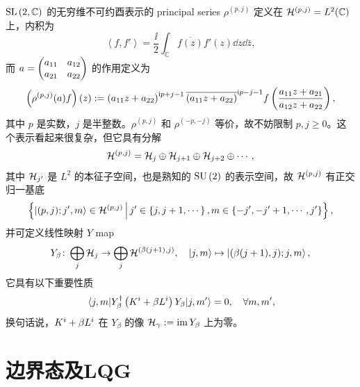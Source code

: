 			$\mathrm{SL}\left( 2,\mathbb{C} \right)$ 的无穷维不可约酉表示的 principal series $\rho^{(p,j)}$ 定义在 $\mathcal{H}^{(p,j)} = L^2(\mathbb{C})$ 上，内积为
			\begin{equation}
				\left\langle f, f' \right\rangle = \frac{\ii}{2} \int_{\mathbb{C}} \overline{f(z)} f'(z) \dd{z} \dd{\bar{z}},
			\end{equation}
			而 $a = \mqty(a_{11} & a_{12} \\ a_{21} & a_{22})$ 的作用定义为
			\begin{equation}
				\left( \rho^{(p,j)}(a) f \right)(z) := \left( a_{11} z + a_{22} \right)^{\mathrm{i} p+j-1} \overline{\left( a_{11} z + a_{22} \right)}^{\mathrm{i} p-j-1} f\left( \frac{a_{11}z+a_{21}}{a_{12}z +a_{22}} \right),
			\end{equation}
			其中 $p$ 是实数，$j$ 是半整数。$\rho^{(p,j)}$ 和 $\rho^{(-p,-j)}$ 等价，故不妨限制 $p,j \geqslant 0$。这个表示看起来很复杂，但它具有分解
			\begin{equation}
				\mathcal{H}^{(p,j)} = \mathcal{H}_j \oplus \mathcal{H}_{j+1} \oplus \mathcal{H}_{j+2} \oplus \cdots,
			\end{equation}
			其中 $\mathcal{H}_{j'}$ 是 $L^2$ 的本征子空间，也是熟知的 $\mathrm{SU}\left(2\right)$ 的表示空间，故 $\mathcal{H}^{(p,j)}$ 有正交归一基底
			\begin{equation}
				\left\{ \ket{(p,j);j',m} \in \mathcal{H}^{(p,j)} \,\middle|\, j' \in \left\{ j,j+1,\cdots \right\} , m\in \left\{ -j',-j'+1, \cdots , j' \right\} \right\},
			\end{equation}
			并可定义线性映射 $Y$ map
			\begin{equation}
				Y_\beta \colon \bigoplus_j \Hil_j \rightarrow \bigoplus_j \Hil^{(\beta(j+1),j)} \qc \ket{j,m} \mapsto \ket{(\beta(j+1),j);j,m},
			\end{equation}
			它具有以下重要性质
			\begin{equation}
				\mel{j,m}{Y_\beta^\dagger \left( \tensor{K}{^i} + \beta \tensor{L}{^i} \right) Y_\beta}{j,m'} = 0 \qc \forall m,m',
			\end{equation}
			换句话说，$\tensor{K}{^i} + \beta \tensor{L}{^i}$ 在 $Y_\beta$ 的像 $\mathcal{H}_\gamma := \operatorname{im}{Y_\beta}$ 上为零。

		\section{边界态及LQG}

